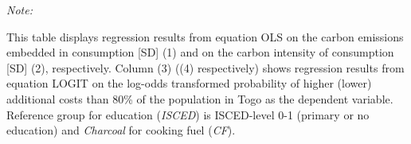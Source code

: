 \begin{table}[htbp!]
\begin{adjustbox}{width = 1\textwidth, max height = 0.95\textheight, center}
\begin{threeparttable}[b]
         \begin{tablenotes}\item \medskip \textit{Note:}
            \item This table displays regression results from equation OLS on the carbon emissions embedded in consumption [SD] (1) and on the carbon intensity of consumption [SD] (2), respectively. 
                                      Column (3) ((4) respectively) shows regression results from equation LOGIT on the log-odds transformed probability of higher (lower) additional costs than 80\% of the population in Togo as the dependent variable. Reference group for education (\textit{ISCED}) is ISCED-level 0-1 (primary or no education) and \textit{Charcoal} for cooking fuel (\textit{CF}).
         \end{tablenotes}
      \end{threeparttable}
   \end{adjustbox}
\end{table}


